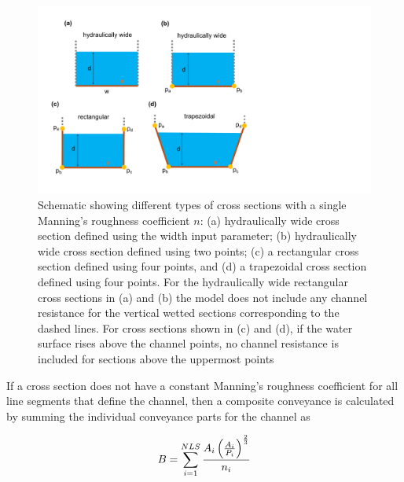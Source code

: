\documentclass[fleqn]{article}
\begin{document}
\begin{figure}
	\centering
	\includegraphics[scale=0.5]{figures/cxs.pdf}
	\caption[Schematic showing different types of channel cross sections with constant roughness.]{Schematic showing different types of cross sections with a single Manning's roughness coefficient $n$: (a) hydraulically wide cross section defined using the width input parameter; (b) hydraulically wide cross section defined using two points; (c) a rectangular cross section defined using four points, and (d) a trapezoidal cross section defined using four points.  For the hydraulically wide rectangular cross sections in (a) and (b) the model does not include any channel resistance for the vertical wetted sections corresponding to the dashed lines.  For cross sections shown in (c) and (d), if the water surface rises above the channel points, no channel resistance is included for sections above the uppermost points}
	\label{fig:cxs}
\end{figure}

If a cross section does not have a constant Manning's roughness coefficient for all line segments that define the channel, then a composite conveyance is calculated by summing the individual conveyance parts for the channel as

\begin{equation}
  B = \sum_{i=1}^{NLS} \frac{A_i \left ( \frac {A_i}{P_i}\right )^{2 \over 3}}{n_i}
\end{equation}
\end{document}
